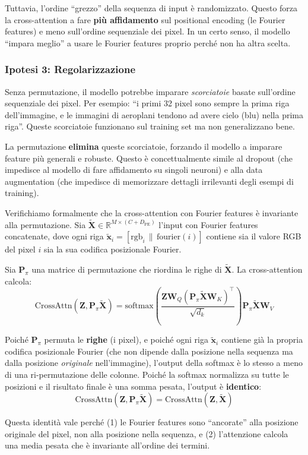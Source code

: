 \documentclass[12pt,a4paper]{article}
\begin{document}
Tuttavia, l'ordine ``grezzo'' della sequenza di input \`e randomizzato. Questo forza la cross-attention a fare \textbf{pi\`u affidamento} sul positional encoding (le Fourier features) e meno sull'ordine sequenziale dei pixel. In un certo senso, il modello ``impara meglio'' a usare le Fourier features proprio perch\'e non ha altra scelta.

\subsubsection{Ipotesi 3: Regolarizzazione}

Senza permutazione, il modello potrebbe imparare \textit{scorciatoie} basate sull'ordine sequenziale dei pixel. Per esempio: ``i primi 32 pixel sono sempre la prima riga dell'immagine, e le immagini di aeroplani tendono ad avere cielo (blu) nella prima riga''. Queste scorciatoie funzionano sul training set ma non generalizzano bene.

La permutazione \textbf{elimina} queste scorciatoie, forzando il modello a imparare feature pi\`u generali e robuste. Questo \`e concettualmente simile al dropout (che impedisce al modello di fare affidamento su singoli neuroni) e alla data augmentation (che impedisce di memorizzare dettagli irrilevanti degli esempi di training).

\begin{proofbox}
Verifichiamo formalmente che la cross-attention con Fourier features \`e invariante alla permutazione. Sia $\widetilde{\mathbf{X}} \in \mathbb{R}^{M \times (C + D_{\text{PE}})}$ l'input con Fourier features concatenate, dove ogni riga $\widetilde{\mathbf{x}}_i = [\text{rgb}_i \,\|\, \text{fourier}(i)]$ contiene sia il valore RGB del pixel $i$ sia la sua codifica posizionale Fourier.

Sia $\mathbf{P}_\pi$ una matrice di permutazione che riordina le righe di $\widetilde{\mathbf{X}}$. La cross-attention calcola:
\[
\text{CrossAttn}(\mathbf{Z}, \mathbf{P}_\pi \widetilde{\mathbf{X}}) = \text{softmax}\!\left(\frac{\mathbf{Z} \mathbf{W}_Q (\mathbf{P}_\pi \widetilde{\mathbf{X}} \mathbf{W}_K)^\top}{\sqrt{d_k}}\right) \mathbf{P}_\pi \widetilde{\mathbf{X}} \mathbf{W}_V
\]

Poich\'e $\mathbf{P}_\pi$ permuta le \textbf{righe} (i pixel), e poich\'e ogni riga $\widetilde{\mathbf{x}}_i$ contiene gi\`a la propria codifica posizionale Fourier (che non dipende dalla posizione nella sequenza ma dalla posizione \emph{originale} nell'immagine), l'output della softmax \`e lo stesso a meno di una ri-permutazione delle colonne. Poich\'e la softmax normalizza su tutte le posizioni e il risultato finale \`e una somma pesata, l'output \`e \textbf{identico}:
\[
\text{CrossAttn}(\mathbf{Z}, \mathbf{P}_\pi \widetilde{\mathbf{X}}) = \text{CrossAttn}(\mathbf{Z}, \widetilde{\mathbf{X}})
\]

Questa identit\`a vale perch\'e (1) le Fourier features sono ``ancorate'' alla posizione originale del pixel, non alla posizione nella sequenza, e (2) l'attenzione calcola una media pesata che \`e invariante all'ordine dei termini.
\end{proofbox}
\end{document}
